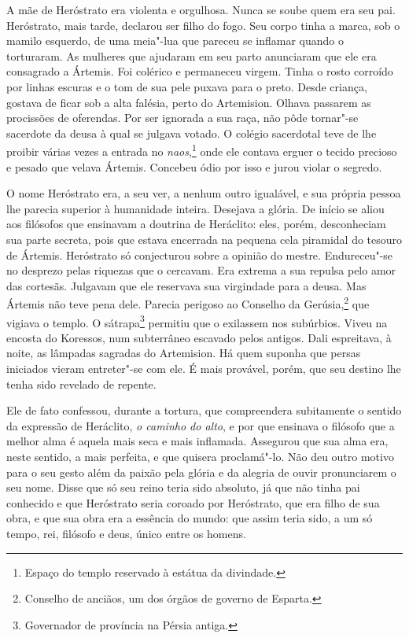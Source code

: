 A mãe de Heróstrato era violenta e orgulhosa. Nunca se soube quem era seu
pai. Heróstrato, mais tarde, declarou ser filho do fogo. Seu corpo tinha a
marca, sob o mamilo esquerdo, de uma meia"-lua que pareceu se inflamar
quando o torturaram. As mulheres que ajudaram em seu parto anunciaram que
ele era consagrado a Ártemis. Foi colérico e permaneceu virgem. Tinha o
rosto corroído por linhas escuras e o tom de sua pele puxava para o preto.
Desde criança, gostava de ficar sob a alta falésia, perto do Artemision.
Olhava passarem as procissões de oferendas. Por ser ignorada a sua raça,
não pôde tornar"-se sacerdote da deusa à qual se julgava votado. O colégio
sacerdotal teve de lhe proibir várias vezes a entrada no
\textit{naos},\footnote{ Espaço do templo reservado à estátua da divindade.} 
onde ele contava erguer o tecido precioso e pesado que velava
Ártemis. Concebeu ódio por isso e jurou violar o segredo.

O nome Heróstrato era, a seu ver, a nenhum outro igualável, e sua própria
pessoa lhe parecia superior à humanidade inteira. Desejava a glória. De
início se aliou aos filósofos que ensinavam a doutrina de Heráclito: eles,
porém, desconheciam sua parte secreta, pois que estava encerrada na
pequena cela piramidal do tesouro de Ártemis. Heróstrato só conjecturou
sobre a opinião do mestre. Endureceu"-se no desprezo pelas riquezas que o
cercavam. Era extrema a sua repulsa pelo amor das cortesãs. Julgavam que
ele reservava sua virgindade para a deusa. Mas Ártemis não teve pena dele.
Parecia perigoso ao Conselho da Gerúsia,\footnote{ Conselho de anciãos, um
dos órgãos de governo de Esparta.} que vigiava o templo. O
sátrapa\footnote{ Governador de província na Pérsia antiga.}
permitiu que o exilassem nos subúrbios. Viveu na encosta do Koressos, num
subterrâneo escavado pelos antigos. Dali espreitava, à noite, as lâmpadas
sagradas do Artemision. Há quem suponha que persas iniciados vieram
entreter"-se com ele. É mais provável, porém, que seu destino lhe tenha
sido revelado de repente.

Ele de fato confessou, durante a tortura, que compreendera subitamente o
sentido da expressão de Heráclito, \textit{o caminho do alto}, e por que
ensinava o filósofo que a melhor alma é aquela mais seca e mais inflamada.
Assegurou que sua alma era, neste sentido, a mais perfeita, e que quisera
proclamá"-lo. Não deu outro motivo para o seu gesto além da paixão pela
glória e da alegria de ouvir pronunciarem o seu nome. Disse que só seu
reino teria sido absoluto, já que não tinha pai conhecido e que Heróstrato
seria coroado por Heróstrato, que era filho de sua obra, e que sua obra
era a essência do mundo: que assim teria sido, a um só tempo, rei,
filósofo e deus, único entre os homens.

